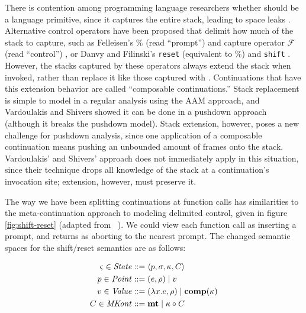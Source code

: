 \documentclass{llncs}
\newcommand{\Scribtexttt}[1]{{\texttt{#1}}}
\newcommand{\SColorize}[2]{\color{#1}{#2}}
\newcommand{\inColor}[2]{{\Scribtexttt{\SColorize{#1}{#2}}}}
\newcommand{\rackett}[1]{\inColor{black}{#1}}
\begin{document}
There is contention among programming language researchers whether
\rackett{call/cc} should be a language primitive, since it captures
the entire stack, leading to space leaks
\citep{ianjohnson:kiselyov:against-callcc}. Alternative control
operators have been proposed that delimit how much of the stack to
capture, such as Felleisen's $\%$ (read ``prompt'') and capture
operator ${\mathcal F}$ (read ``control'')
\citep{ianjohnson:felleisen:control:1988}, or Danvy and Filinski's
\texttt{reset} (equivalent to $\%$) and \texttt{shift}
\citep{ianjohnson:danvy:filinski:delim:1990}. However, the stacks
captured by these operators always extend the stack when invoked,
rather than replace it like those captured with
\rackett{call/cc}. Continuations that have this extension behavior are
called ``composable continuations.'' Stack replacement is simple to
model in a regular analysis using the AAM approach, and Vardoulakis
and Shivers showed it can be done in a pushdown approach (although it
breaks the pushdown model). Stack extension, however, poses a new
challenge for pushdown analysis, since one application of a composable
continuation means pushing an unbounded amount of frames onto the
stack. Vardoulakis' and Shivers' approach does not immediately apply
in this situation, since their technique drops all knowledge of the
stack at a continuation's invocation site; extension, however, must
preserve it.

The way we have been splitting continuations at function calls has
similarities to the meta-continuation approach to modeling delimited
control, given in figure \ref{fig:shift-reset} (adapted from
~\citep{ianjohnson:Biernacki2006274}). We could view each function
call as inserting a prompt, and returns as aborting to the nearest
prompt. The changed semantic spaces for the shift/reset semantics are as
follows:

\begin{align*}
  \varsigma \in \mathit{State} &::= \langle p, \sigma, \kappa, C \rangle \\
  p \in \mathit{Point} &::= (e, \rho) \mid v \\
  v \in \mathit{Value} &::= (\lambda{} x. e, \rho) \mid \mathbf{comp}(\kappa) \\
  C \in \mathit{MKont} &::= \mathbf{mt} \mid \kappa\circ C
\end{align*}
\end{document}
